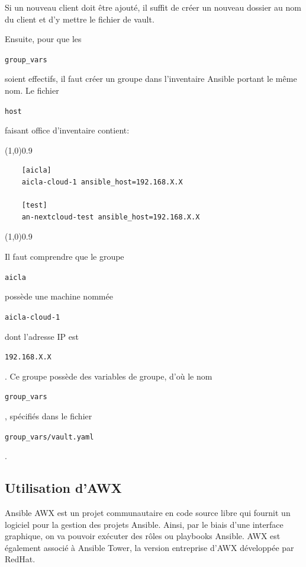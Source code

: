\documentclass[12pt, a4paper, twoside]{article}
\begin{document}
Si un nouveau client doit être ajouté, il suffit de créer un nouveau dossier au nom du client et d'y mettre le fichier de vault.

Ensuite, pour que les \begin{code}\texttt{group\_vars}\end{code} soient effectifs, il faut créer un groupe dans l'inventaire \gls{Ansible} portant le même nom. 
Le fichier \begin{code}\texttt{host}\end{code} faisant office d'inventaire contient:
\vspace{-1ex}
\begin{code}
\vspace{-1ex}
\begin{center} 
    \line(1,0){0.9\textwidth} 
\end{center}
\vspace{-1ex}
\begin{verbatim}
    [aicla]
    aicla-cloud-1 ansible_host=192.168.X.X
    
    [test]
    an-nextcloud-test ansible_host=192.168.X.X
\end{verbatim}
\vspace{-1ex}
\begin{center} 
    \line(1,0){0.9\textwidth} 
\end{center}
\vspace{-1ex}
\end{code}


Il faut comprendre que le groupe \begin{code}\texttt{aicla}\end{code} possède une machine nommée \begin{code}\texttt{aicla-cloud-1}\end{code} dont l'adresse \gls{IP} est \begin{code}\texttt{192.168.X.X}\end{code}. 
Ce groupe possède des variables de groupe, d'où le nom \begin{code}\texttt{group\_vars}\end{code}, spécifiés dans le fichier \begin{code}\texttt{group\_vars/vault.yaml}\end{code}.

\newpage
\subsection{Utilisation d'AWX}
Ansible AWX est un projet communautaire en code source libre qui fournit un logiciel pour la gestion des projets Ansible.
Ainsi, par le biais d'une interface graphique, on va pouvoir exécuter des rôles ou playbooks Ansible.
AWX est également associé à Ansible Tower, la version entreprise d'AWX développée par RedHat.
\end{document}
